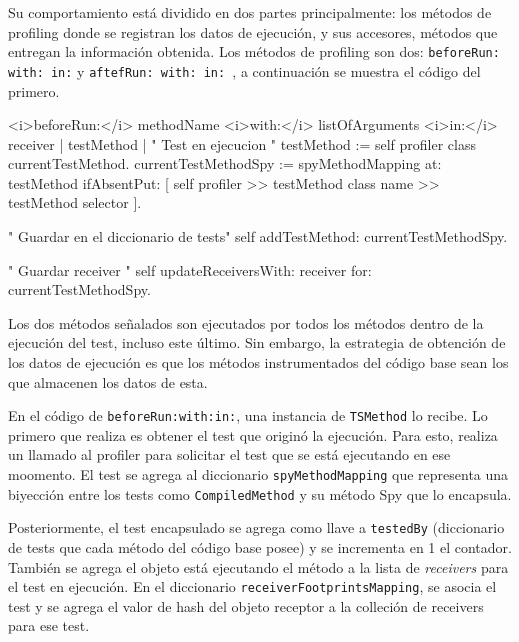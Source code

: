 \par Su comportamiento está dividido en dos partes principalmente: los métodos de profiling donde se registran los datos de ejecución, y sus accesores, métodos que entregan la información obtenida. Los métodos de profiling son dos: {\tt beforeRun: with: in:} y {\tt aftefRun: with: in: }, a continuación se muestra el código del primero. 

\begin{codeWithLineNumbers}
<i>beforeRun:</i> methodName <i>with:</i> listOfArguments <i>in:</i> receiver
	| testMethod |
	" Test en ejecucion "
	testMethod := self profiler class currentTestMethod.
	currentTestMethodSpy := 
			spyMethodMapping at: testMethod ifAbsentPut: 
				[ self profiler >> testMethod class name >> testMethod selector ].
		
	" Guardar en el diccionario de tests"	
	self addTestMethod: currentTestMethodSpy.

	" Guardar receiver "
	self updateReceiversWith: receiver for: currentTestMethodSpy.

\end{codeWithLineNumbers}

\par Los dos métodos señalados son ejecutados por todos los métodos dentro de la ejecución del test, incluso este último. Sin embargo, la estrategia de obtención de los datos de ejecución es que los métodos instrumentados del código base sean los que almacenen los datos de esta. 

\par En el código de {\tt beforeRun:with:in:}, una instancia de {\tt TSMethod} lo recibe. Lo primero que realiza es obtener el test que originó la ejecución. Para esto, realiza un llamado al profiler para solicitar el test que se está ejecutando en ese moomento. El test se agrega al diccionario {\tt spyMethodMapping} que representa una biyección entre los tests como {\tt CompiledMethod} y su método Spy que lo encapsula. 

\par Posteriormente, el test encapsulado se agrega como llave a {\tt testedBy} (diccionario de tests que cada método del código base posee) y se incrementa en 1 el contador. También se agrega el objeto está ejecutando el método a la lista de \emph{receivers} para el test en ejecución. En el diccionario {\tt receiverFootprintsMapping}, se asocia el test y se agrega el valor de hash del objeto receptor a la colleción de receivers para ese test.

